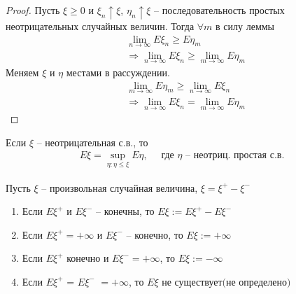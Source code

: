 \begin{proof}
  Пусть $\xi \geq 0$ и $\xi_n \uparrow \xi$,\; $\eta_n \uparrow \xi$ -- последовательность простых неотрицательных случайных величин. Тогда $\forall m$ в силу леммы
  \begin{align*}
    &\lim_{n \to \infty} E \xi_n \geq E \eta_m\\
    &\Rightarrow \lim_{n \to \infty} E \xi_n \geq \lim_{m \to \infty} E \eta_m
  \end{align*}
  Меняем $\xi$ и $\eta$ местами в рассуждении.
  \begin{align*}
    &\lim_{m \to \infty} E \eta_m \geq \lim_{n \to \infty} E \xi_n\\
    &\Rightarrow \lim_{n \to \infty} E \xi_n = \lim_{m \to \infty} E \eta_m
  \end{align*}
\end{proof}

\begin{remark}
  Если $\xi$ -- неотрицательная с.в., то
  \begin{align*}
    E\xi = \sup_{\eta: \eta \leq \xi} E\eta, \quad \text{ где $\eta$ -- неотриц. простая с.в.}
  \end{align*}
\end{remark}


\begin{definition}
  Пусть $\xi$ -- произвольная случайная величина, $\xi = \xi^+ - \xi^-$

  \begin{enumerate}
    \item 
      Если $E \xi^+$ и $E \xi^-$ -- конечны, то 
      $\boxed{E\xi := E \xi^+ - E \xi^-}$

    \item 
      Если $E \xi^+ = +\infty$ и $E \xi^-$ -- конечно, то $\boxed{E\xi := +\infty}$

    \item
      Если $E \xi^+$ конечно и $E \xi^- = +\infty$, то $\boxed{E\xi := -\infty}$

    \item 
      Если $E \xi^+$ = $E \xi^-$ $= +\infty$, то $E \xi \text{ не существует(не определено)}$

  \end{enumerate}
\end{definition}

